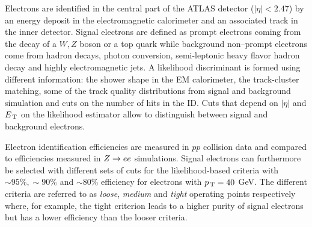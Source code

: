 Electrons are identified in the central part of the ATLAS detector
($|\eta| < 2.47$) by an energy deposit in the electromagnetic calorimeter and an
associated track in the inner detector. Signal electrons are defined as prompt
electrons coming from the decay of a $W, Z$ boson or a top quark while
background non--prompt electrons come from hadron decays, photon conversion,
semi-leptonic heavy flavor hadron decay and highly electromagnetic jets. A
likelihood discriminant is formed using different information: the shower shape
in the EM calorimeter, the track-cluster matching, some of the track quality
distributions from signal and background simulation and cuts on the number of
hits in the ID\@. Cuts that depend on $|\eta|$ and $E_\mathrm{\, T}$ on the likelihood
estimator allow to distinguish between signal and background electrons.

Electron identification efficiencies are measured in $pp$ collision data and
compared to efficiencies measured in $Z \to e e$ simulations. Signal electrons can
furthermore be selected with different sets of cuts for the likelihood-based
criteria with $\sim 95\%, \sim 90\%$ and $\sim 80\%$ efficiency for electrons
with $p_\mathrm{\, T} = 40~$GeV. The different criteria are referred to as \emph{loose},
\emph{medium} and \emph{tight} operating points respectively~\cite{ATL-EL-IDENT}
where, for example, the tight criterion leads to a higher purity of signal
electrons but has a lower efficiency than the looser criteria.

